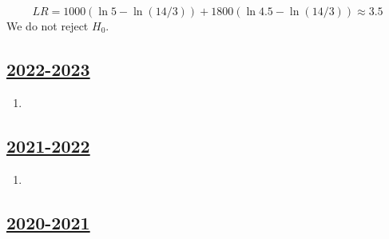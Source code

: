 \begin{enumerate}
\begin{enumerate}
    \[
    LR = 1000 (\ln 5 - \ln (14/3)) + 1800 (\ln 4.5 - \ln (14/3)) \approx 3.5
    \]
    We do not reject $H_0$.
    


\end{enumerate}

\end{enumerate}



\subsection[2022-2023]{\hyperref[sec:kr_04_2022_2023]{2022-2023}}
\label{sec:sol_kr_04_2022_2023} %



\begin{enumerate}

\item 


\end{enumerate}
    


\subsection[2021-2022]{\hyperref[sec:kr_04_2021_2022]{2021-2022}}
\label{sec:sol_kr_04_2021_2022} %



\begin{enumerate}

\item 


\end{enumerate}
    

\subsection[2020-2021]{\hyperref[sec:kr_04_2020_2021]{2020-2021}}
\label{sec:sol_kr_04_2020_2021} %



